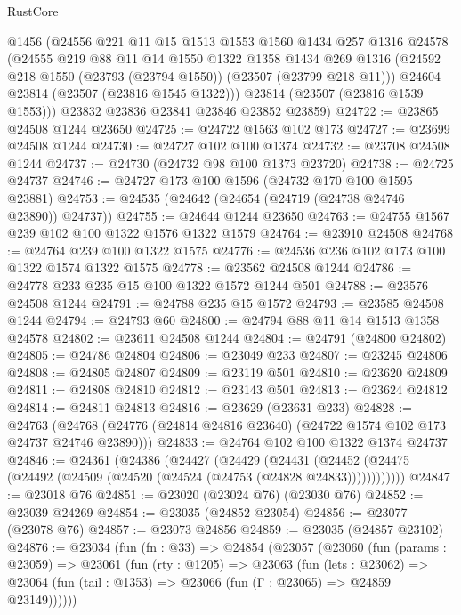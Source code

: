 \begin{lexlean}{RustCore}
\begin{coremodule}
      @1456
      (@24556
        @221
        @11
        @15
        @1513
        @1553
        @1560
        @1434
        @257
        @1316
        @24578
        (@24555
          @219
          @88
          @11
          @14
          @1550
          @1322
          @1358
          @1434
          @269
          @1316
          (@24592 @218 @1550 (@23793 (@23794 @1550)) (@23507 (@23799 @218 @11)))
          @24604
          @23814
          (@23507 (@23816 @1545 @1322)))
        @23814
        (@23507 (@23816 @1539 @1553)))
      @23832
      @23836
      @23841
      @23846
      @23852
      @23859)
@24722 := @23865 @24508 @1244 @23650
@24725 := @24722 @1563 @102 @173
@24727 := @23699 @24508 @1244
@24730 := @24727 @102 @100 @1374
@24732 := @23708 @24508 @1244
@24737 := @24730 (@24732 @98 @100 @1373 @23720)
@24738 := @24725 @24737
@24746 := @24727 @173 @100 @1596 (@24732 @170 @100 @1595 @23881)
@24753 := @24535 (@24642 (@24654 (@24719 (@24738 @24746 @23890)) @24737))
@24755 := @24644 @1244 @23650
@24763 := @24755 @1567 @239 @102 @100 @1322 @1576 @1322 @1579
@24764 := @23910 @24508
@24768 := @24764 @239 @100 @1322 @1575
@24776 := @24536 @236 @102 @173 @100 @1322 @1574 @1322 @1575
@24778 := @23562 @24508 @1244
@24786 := @24778 @233 @235 @15 @100 @1322 @1572 @1244 @501
@24788 := @23576 @24508 @1244
@24791 := @24788 @235 @15 @1572
@24793 := @23585 @24508 @1244
@24794 := @24793 @60
@24800 := @24794 @88 @11 @14 @1513 @1358 @24578
@24802 := @23611 @24508 @1244
@24804 := @24791 (@24800 @24802)
@24805 := @24786 @24804
@24806 := @23049 @233
@24807 := @23245 @24806
@24808 := @24805 @24807
@24809 := @23119 @501
@24810 := @23620 @24809
@24811 := @24808 @24810
@24812 := @23143 @501
@24813 := @23624 @24812
@24814 := @24811 @24813
@24816 := @23629 (@23631 @233)
@24828 := @24763
    (@24768 (@24776 (@24814 @24816 @23640) (@24722 @1574 @102 @173 @24737 @24746 @23890)))
@24833 := @24764 @102 @100 @1322 @1374 @24737
@24846 := @24361
    (@24386
      (@24427
        (@24429
          (@24431 (@24452 (@24475 (@24492 (@24509 (@24520 (@24524 (@24753 (@24828 @24833))))))))))))
@24847 := @23018 @76
@24851 := @23020 (@23024 @76) (@23030 @76)
@24852 := @23039 @24269
@24854 := @23035 (@24852 @23054)
@24856 := @23077 (@23078 @76)
@24857 := @23073 @24856
@24859 := @23035 (@24857 @23102)
@24876 := @23034
    (fun (fn : @33) =>
    @24854
      (@23057
        (@23060
          (fun (params : @23059) =>
          @23061
            (fun (rty : @1205) =>
            @23063
              (fun (lets : @23062) =>
              @23064 (fun (tail : @1353) => @23066 (fun (Γ : @23065) => @24859 @23149))))))

\end{coremodule}
\end{lexlean}
